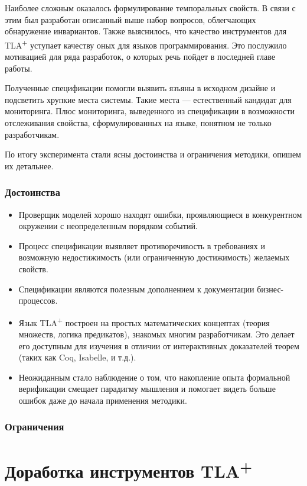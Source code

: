 \documentclass[14pt, openany]{book}
\newcommand{\tlapl}{TLA\textsuperscript{+} }
\begin{document}
Наиболее сложным оказалось формулирование темпоральных свойств. В связи с этим был разработан описанный выше набор вопросов, облегчающих обнаружение инвариантов. Также выяснилось, что качество инструментов для \tlapl уступает качеству оных для языков программирования. Это послужило мотивацией для ряда разработок, о которых речь пойдет в последней главе работы.

Полученные спецификации помогли выявить язъяны в исходном дизайне и подсветить хрупкие места системы. Такие места --- естественный кандидат для мониторинга. Плюс мониторинга, выведенного из спецификации в возможности отслеживания свойства, сформулированных на языке, понятном не только разработчикам.

По итогу эксперимента стали ясны достоинства и ограничения методики, опишем их детальнее.

\subsection{Достоинства}
\begin{itemize}
  \item Проверщик моделей хорошо находят ошибки, проявляющиеся в конкурентном окружении с неопределенным порядком событий.
  \item Процесс спецификации выявляет противоречивость в требованиях и возможную недостижимость (или ограниченную достижимость) желаемых свойств.
  \item Спецификации являются полезным дополнением к документации бизнес-процессов.
  \item Язык \tlapl построен на простых математических концептах (теория множеств, логика предикатов), знакомых многим разработчикам. Это делает его доступным для изучения в отличии от интерактивных доказателей теорем (таких как Coq, Isabelle, и т.д.).
  \item Неожиданным стало наблюдение о том, что накопление опыта формальной верификации смещает парадигму мышления и помогает видеть больше ошибок даже до начала применения методики.
\end{itemize}



\subsection{Ограничения}

\chapter{Доработка инструментов \tlapl}
\end{document}
